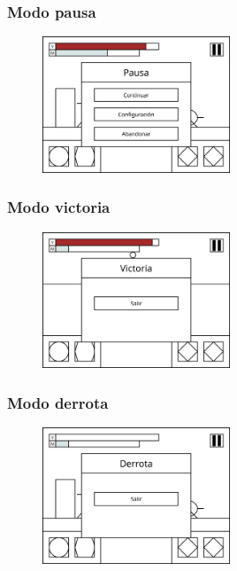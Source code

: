 \subsubsection{Modo pausa}
\begin{figure}[H]
    \centering
    \includegraphics[width=0.5\textwidth]{5-Cuerpo/Chapter5/I7.png} %
    \caption{}
    \label{fig:I7}
\end{figure}

\subsubsection{Modo victoria}
\begin{figure}[H]
    \centering
    \includegraphics[width=0.5\textwidth]{5-Cuerpo/Chapter5/I9.png} %
    \caption{}
    \label{fig:I9}
\end{figure}

\subsubsection{Modo derrota}
\begin{figure}[H]
    \centering
    \includegraphics[width=0.5\textwidth]{5-Cuerpo/Chapter5/I8.png} %
    \caption{}
    \label{fig:I8}
\end{figure}


